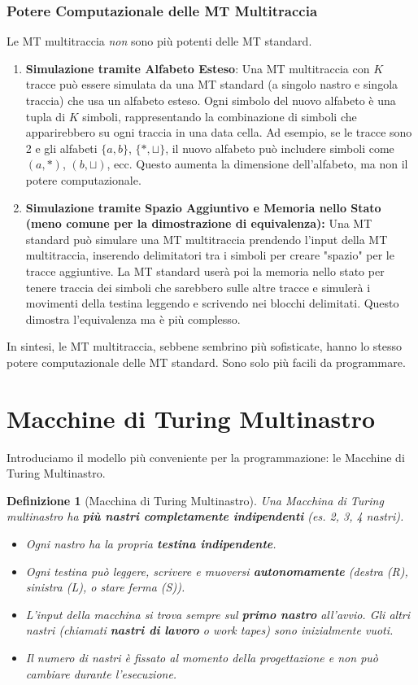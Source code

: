 \documentclass[a4paper, 11pt]{book} %
\newtheorem{definition}[theorem]{Definizione}
\theoremstyle{definition}
\begin{document}
\subsubsection{Potere Computazionale delle MT Multitraccia}
Le MT multitraccia \emph{non} sono più potenti delle MT standard.
\begin{enumerate}
    \item \textbf{Simulazione tramite Alfabeto Esteso}:
    Una MT multitraccia con $K$ tracce può essere simulata da una MT standard (a singolo nastro e singola traccia) che usa un alfabeto esteso. Ogni simbolo del nuovo alfabeto è una tupla di $K$ simboli, rappresentando la combinazione di simboli che apparirebbero su ogni traccia in una data cella. Ad esempio, se le tracce sono 2 e gli alfabeti $\{a,b\}$, $\{*, \sqcup\}$, il nuovo alfabeto può includere simboli come $(a, *)$, $(b, \sqcup)$, ecc. Questo aumenta la dimensione dell'alfabeto, ma non il potere computazionale.
    \item \textbf{Simulazione tramite Spazio Aggiuntivo e Memoria nello Stato (meno comune per la dimostrazione di equivalenza):}
    Una MT standard può simulare una MT multitraccia prendendo l'input della MT multitraccia, inserendo delimitatori tra i simboli per creare "spazio" per le tracce aggiuntive. La MT standard userà poi la memoria nello stato per tenere traccia dei simboli che sarebbero sulle altre tracce e simulerà i movimenti della testina leggendo e scrivendo nei blocchi delimitati. Questo dimostra l'equivalenza ma è più complesso.
\end{enumerate}
In sintesi, le MT multitraccia, sebbene sembrino più sofisticate, hanno lo stesso potere computazionale delle MT standard. Sono solo più facili da programmare.

\section{Macchine di Turing Multinastro}
Introduciamo il modello più conveniente per la programmazione: le Macchine di Turing Multinastro.

\begin{definition}[Macchina di Turing Multinastro]
Una Macchina di Turing multinastro ha \textbf{più nastri completamente indipendenti} (es. 2, 3, 4 nastri).
\begin{itemize}
    \item Ogni nastro ha la propria \textbf{testina indipendente}.
    \item Ogni testina può leggere, scrivere e muoversi \textbf{autonomamente} (destra (R), sinistra (L), o stare ferma (S)).
    \item L'input della macchina si trova sempre sul \textbf{primo nastro} all'avvio. Gli altri nastri (chiamati \textbf{nastri di lavoro} o \emph{work tapes}) sono inizialmente vuoti.
    \item Il numero di nastri è fissato al momento della progettazione e non può cambiare durante l'esecuzione.
\end{itemize}
\end{definition}
\end{document}
